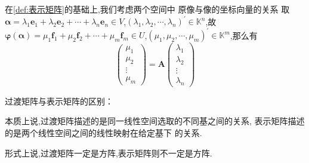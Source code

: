 \begin{green}
\begin{corollary}[坐标向量的关系]\label{cor:坐标向量的关系}
    在\cref{def:表示矩阵}的基础上,我们考虑两个空间中
    原像与像的坐标向量的关系
    取$\bm{\alpha}=\lambda_1\bm{e}_1+\lambda_2\bm{e}_2
    +
    \cdots+\lambda_n\bm{e}_n \in V$,$
    \left(\lambda_1,\lambda_2,\cdots,\lambda_n
    \right)^{\prime}\in \mathbb{K}^n$,故$\bm{\varphi}\left(
        \bm{\alpha}
    \right)=\mu_1\bm{f}_1+\mu_2\bm{f}_2+
    \cdots+
    \mu_m\bm{f}_m\in U$,$\left(
        \mu_1,\mu_2,\cdots,\mu_m
    \right)^{\prime}\in \mathbb{K}^m$,那么有
    \[
    \begin{pmatrix}
        \mu_1\\
        \mu_2\\
        \vdots\\
        \mu_m
    \end{pmatrix}
    =\bm{A}\begin{pmatrix}
        \lambda_1\\
        \lambda_2\\
        \vdots\\
        \lambda_n
    \end{pmatrix}
    \]
\end{corollary}
\end{green}
\begin{red}
\begin{remark}
    过渡矩阵与表示矩阵的区别：

    本质上说,过渡矩阵描述的是同一线性空间选取的不同基之间的关系,
    表示矩阵描述的是两个线性空间之间的线性映射在给定基下
    的关系.

    形式上说,过渡矩阵一定是方阵,表示矩阵则不一定是方阵.
\end{remark}
\end{red}
